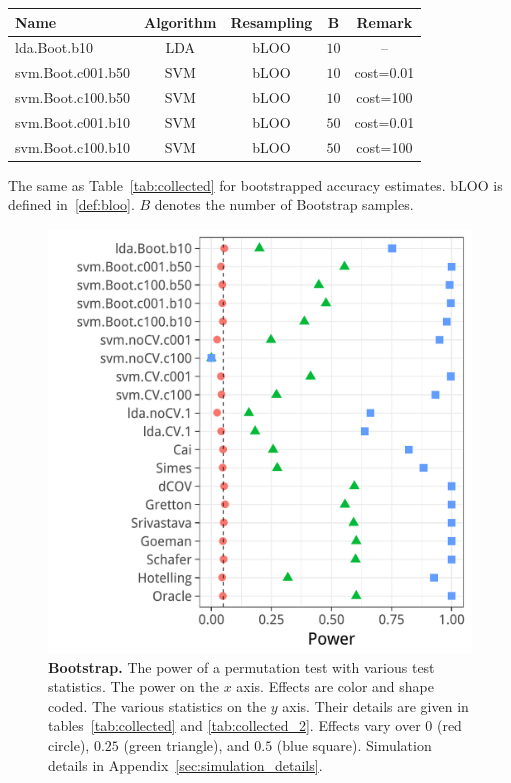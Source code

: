 \documentclass[journal]{IEEEtran}
\begin{document}
\begin{tcolorbox}
	\centering
	\footnotesize
	\begin{tabular}{l|c|c|c|c}
		Name & Algorithm & Resampling & B  & Remark\\ 
		\hline
		\hline
		lda.Boot.b10 & LDA & bLOO 	& $10$ &  -- \\ 
		svm.Boot.c001.b50 & SVM & bLOO 	& $10$ & cost=0.01 \\ 
		svm.Boot.c100.b50 & SVM & bLOO 	& $10$ & cost=100 \\ 
		svm.Boot.c001.b10 & SVM & bLOO 	& $50$ & cost=0.01 \\ 
		svm.Boot.c100.b10 & SVM & bLOO 	& $50$ & cost=100 \\ 
	\end{tabular} 
	\captionsetup{type=table}
	\caption{\footnotesize
		The same as Table~\ref{tab:collected} for bootstrapped accuracy estimates. 
		bLOO is defined in~\ref{def:bloo}.
		$B$ denotes the number of Bootstrap samples.} 
	\label{tab:collected_2}
\end{tcolorbox}


\begin{figure}[ht]
	\centering
	\includegraphics[width=0.7\columnwidth]{"art/file13"}
	\caption{
		\textbf{Bootstrap.}
		The power of a permutation test with various test statistics. 
		The power on the $x$ axis. 
		Effects are color and shape coded. 
		The various statistics on the $y$ axis. 
		Their details are given in tables~\ref{tab:collected} and \ref{tab:collected_2}. 
		Effects vary over $0$ (red circle), $0.25$ (green triangle), and $0.5$ (blue square). 
		Simulation details in Appendix~\ref{sec:simulation_details}.
	} 
	\label{fig:bootstrap}
\end{figure}
\end{document}
